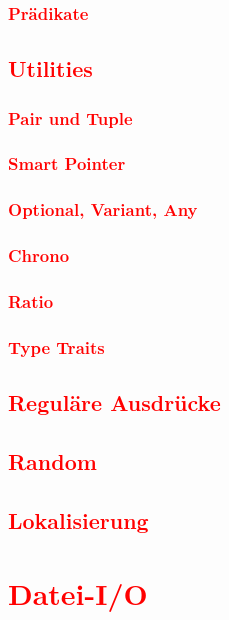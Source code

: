\subsection{\textcolor{red}{Prädikate}}\label{sec:predicates}
\section{\textcolor{red}{Utilities}}\label{sec:utilities}
\subsection{\textcolor{red}{Pair und Tuple}}\label{sec:pair-tuple}
\subsection{\textcolor{red}{Smart Pointer}}\label{sec:smart-pointers-std}
\subsection{\textcolor{red}{Optional, Variant, Any}}\label{sec:optional-variant-any}
\subsection{\textcolor{red}{Chrono}}\label{sec:chrono}
\subsection{\textcolor{red}{Ratio}}\label{sec:ratio}
\subsection{\textcolor{red}{Type Traits}}\label{sec:type-traits}
\section{\textcolor{red}{Reguläre Ausdrücke}}\label{sec:regex}
\section{\textcolor{red}{Random}}\label{sec:random}
\section{\textcolor{red}{Lokalisierung}}\label{sec:localization}

\chapter{\textcolor{red}{Datei-I/O}}\label{chap:file-io}
